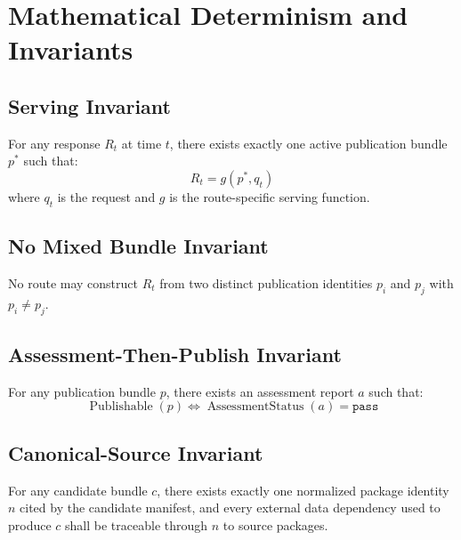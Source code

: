 \chapter{Mathematical Determinism and Invariants}
\section{Serving Invariant}
For any response \(R_t\) at time \(t\), there exists exactly one active publication bundle \(p^*\) such that:
\[
R_t = g(p^*, q_t)
\]
where \(q_t\) is the request and \(g\) is the route-specific serving function.

\section{No Mixed Bundle Invariant}
No route may construct \(R_t\) from two distinct publication identities \(p_i\) and \(p_j\) with \(p_i \ne p_j\).

\section{Assessment-Then-Publish Invariant}
For any publication bundle \(p\), there exists an assessment report \(a\) such that:
\[
\operatorname{Publishable}(p) \iff \operatorname{AssessmentStatus}(a)=\texttt{pass}
\]

\section{Canonical-Source Invariant}
For any candidate bundle \(c\), there exists exactly one normalized package identity \(n\) cited by the candidate manifest, and every external data dependency used to produce \(c\) shall be traceable through \(n\) to source packages.

